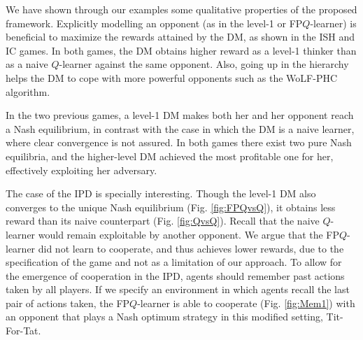 We have shown through our examples some qualitative properties of the proposed framework. Explicitly modelling an opponent (as in the level-1 or FP$Q$-learner) is beneficial to maximize the rewards attained by the DM, as shown in the ISH and IC games. In both games, the DM obtains higher reward as a level-1 thinker than as a naive $Q$-learner against the same opponent. Also, going up in the hierarchy helps the DM to cope with more powerful opponents such as the WoLF-PHC algorithm.

In the two previous games, a level-1 DM makes both her and her opponent reach a Nash equilibrium, in contrast with the case in which the DM is a naive learner, where clear convergence is not assured. In both games there exist 
two pure Nash equilibria, and the higher-level DM achieved the most profitable one for her, effectively exploiting her adversary.

The case of the IPD is specially interesting. Though the level-1 DM also converges to the unique Nash equilibrium (Fig. \ref{fig:FPQvsQ}), it obtains less reward than its  naive counterpart (Fig. \ref{fig:QvsQ}). Recall that the naive $Q$-learner 
would remain exploitable by another opponent. We argue that the FP$Q$-learner did not learn to cooperate, and thus achieves lower rewards, due to the specification of the game and not as a limitation of our approach. To allow for the emergence of cooperation in the IPD, agents should remember past actions taken by all players. If we specify an environment in which agents recall the last pair of actions taken, the FP$Q$-learner is able to cooperate (Fig. \ref{fig:Mem1}) with an opponent that plays a Nash optimum strategy in this modified setting, Tit-For-Tat. 
\fi




